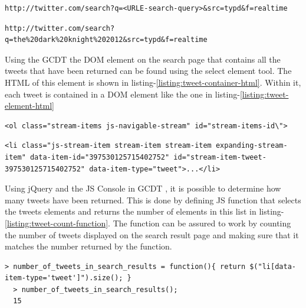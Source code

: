   \begin{lstlisting}[caption={URL of a Twitter HTTP search request for <URLE-search-query>},label={listing:search-request},captionpos=b]
  http://twitter.com/search?q=<URLE-search-query>&src=typd&f=realtime
  \end{lstlisting}

\begin{lstlisting}[caption={URL of a Twitter HTTP search request for "The Dark Knight Rises 2012" parsed to URLE},label={listing:search-request-batman-urle},captionpos=b]
  http://twitter.com/search?q=the%20dark%20knight%202012&src=typd&f=realtime
  \end{lstlisting}

Using the GCDT \cite{gcdt} the DOM element on the search page that contains all the tweets that have been returned can be found using the select element tool. The HTML of this element is shown in listing-\ref{listing:tweet-container-html}. Within it, each tweet is contained in a DOM element like the one in listing-\ref{listing:tweet-element-html}

  \begin{lstlisting}[caption={HTML of the DOM element containing all tweet elements},label={listing:tweet-container-html},captionpos=b]
  <ol class="stream-items js-navigable-stream" id="stream-items-id\">
  \end{lstlisting}

  \begin{lstlisting}[caption={HTML of a tweet element},label={listing:tweet-element-html},captionpos=b]
  <li class="js-stream-item stream-item stream-item expanding-stream-item" data-item-id="397530125715402752" id="stream-item-tweet-397530125715402752" data-item-type="tweet">...</li>
  \end{lstlisting}

Using jQuery \cite{jquery} and the JS Console in GCDT \cite{gcdt}, it is possible to determine how many tweets have been returned. This is done by defining JS function that selects the tweets elements and returns the number of elements in this list in listing-\ref{listing:tweet-count-function}. The function can be assured to work by counting the number of tweets displayed on the search result page and making sure that it matches the number returned by the function.

  \begin{lstlisting}[caption={Creating a function in GCDT JS Console for counting the occurance of tweets on the Twitter search result page},label={listing:tweet-count-function},captionpos=b]
  > number_of_tweets_in_search_results = function(){ return $("li[data-item-type='tweet']").size(); }
  > number_of_tweets_in_search_results();
  15
  \end{lstlisting}

